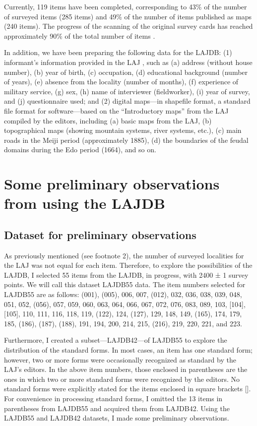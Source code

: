 \documentclass[output=paper]{LSP/langsci}
\begin{document}
Currently, 119 items have been completed, corresponding to 43\% of the number of surveyed items (285 items) and 49\% of the number of items published as maps (240 items). The progress of the scanning of the original survey cards has reached approximately 90\% of the total number of items \citep[159]{kumagai_daikibo_2013}.

In addition, we have been preparing the following data for the LAJDB: (1) informant’s information provided in the LAJ \citep[47--102]{kokuritsu_kokugo_kenkyujo_nlri_nihon_1966}, such as (a) address (without house number), (b) year of birth, (c) occupation, (d) educational background (number of years), (e) absence from the locality (number of months), (f) experience of military service, (g) sex, (h) name of interviewer (fieldworker), (i) year of survey, and (j) questionnaire used; and (2) digital maps—in shapefile format, a standard file format for  software—based on the “Introductory maps” from the LAJ compiled by the editors, including (a) basic maps from the LAJ, (b) topographical maps (showing mountain systems, river systems, etc.), (c) main roads in the Meiji period (approximately 1885), (d) the boundaries of the feudal domains during the Edo period (1664), and so on.

\section{Some preliminary observations from using the LAJDB}

\subsection{Dataset for preliminary observations}
As previously mentioned (see footnote 2), the number of surveyed localities for the LAJ was not equal for each item. Therefore, to explore the possibilities of the LAJDB, I selected 55 items from the LAJDB, in progress, with 2400 ± 1 survey points. We will call this dataset LAJDB55 data. The item numbers selected for LAJDB55 are as follows: (001), (005), 006, 007, (012), 032, 036, 038, 039, 048, 051, 052, (056), 057, 059, 060, 063, 064, 066, 067, 072, 076, 083, 089, 103, [104], [105], 110, 111, 116, 118, 119, (122), 124, (127), 129, 148, 149, (165), 174, 179, 185, (186), (187), (188), 191, 194, 200, 214, 215, (216), 219, 220, 221, and 223.

Furthermore, I created a subset—LAJDB42—of LAJDB55 to explore the distribution of the standard forms. In most cases, an item has one standard form; however, two or more forms were occasionally recognized as standard by the LAJ’s editors. In the above item numbers, those enclosed in parentheses are the ones in which two or more standard forms were recognized by the editors. No standard forms were explicitly stated for the items enclosed in square brackets []. For convenience in processing standard forms, I omitted the 13 items in  parentheses from LAJDB55 and acquired them from LAJDB42. Using the LAJDB55 and LAJDB42 datasets, I made some preliminary observations.
\end{document}
